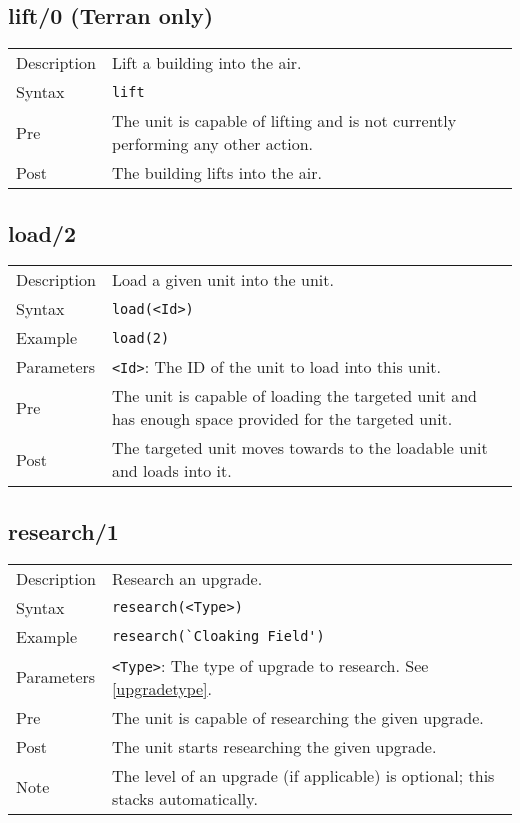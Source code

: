 \subsection{lift/0 (Terran only)}
\begin{tabularx}{\textwidth}{lX}
 Description & Lift a building into the air. \\
 Syntax & \verb|lift| \\
 Pre & The unit is capable of lifting and is not currently performing any other action. \\
 Post & The building lifts into the air.
\end{tabularx}

\subsection{load/2}
\begin{tabularx}{\textwidth}{lX}
 Description & Load a given unit into the unit. \\
 Syntax & \verb|load(<Id>)| \\
 Example & \verb|load(2)| \\
 Parameters & \verb|<Id>|: The ID of the unit to load into this unit. \\
 Pre & The unit is capable of loading the targeted unit and has enough space provided for the targeted unit. \\
 Post & The targeted unit moves towards to the loadable unit and loads into it.
\end{tabularx}

\subsection{research/1}
\begin{tabularx}{\textwidth}{lX}
 Description & Research an upgrade. \\
 Syntax & \verb|research(<Type>)| \\
 Example & \verb|research(`Cloaking Field')| \\
 Parameters & \verb|<Type>|: The type of upgrade to research. See \ref{upgradetype}. \\
 Pre & The unit is capable of researching the given upgrade. \\
 Post & The unit starts researching the given upgrade. \\
 Note & The level of an upgrade (if applicable) is optional; this stacks automatically.
\end{tabularx}

